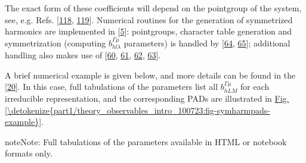\documentclass[letterpaper,table,10pt,english]{jupyterBook}
\begin{document}
\sphinxAtStartPar
The exact form of these coefficients will depend on the point\sphinxhyphen{}group of the system, see, e.g. Refs. {[}\hyperlink{cite.backmatter/bibliography:id553}{118}, \hyperlink{cite.backmatter/bibliography:id836}{119}{]}. Numerical routines for the generation of symmetrized harmonics are implemented in  {[}\hyperlink{cite.backmatter/bibliography:id680}{5}{]}: point\sphinxhyphen{}groups, character table generation and symmetrization (computing \(b_{hl\lambda}^{\Gamma\mu}\) parameters) is handled by  {[}\hyperlink{cite.backmatter/bibliography:id706}{64}, \hyperlink{cite.backmatter/bibliography:id707}{65}{]}; additional handling also makes use of  {[}\hyperlink{cite.backmatter/bibliography:id885}{60}, \hyperlink{cite.backmatter/bibliography:id954}{61}, \hyperlink{cite.backmatter/bibliography:id955}{62}, \hyperlink{cite.backmatter/bibliography:id956}{63}{]}.

\sphinxAtStartPar
A brief numerical example is given below, and more details can be found in the  {[}\hyperlink{cite.backmatter/bibliography:id679}{20}{]}. In this case, full tabulations of the parameters list all \(b_{hLM}^{\Gamma\mu}\) for each irreducible representation, and the corresponding PADs are illustrated in \hyperref[\detokenize{part1/theory_observables_intro_100723:fig-symharmpads-example}]{Fig.\@ \ref{\detokenize{part1/theory_observables_intro_100723:fig-symharmpads-example}}}.

\begin{sphinxShadowBox}
\sphinxstylesidebartitle{}

\begin{sphinxadmonition}{note}{Note:}
\sphinxAtStartPar
Full tabulations of the parameters available in HTML or notebook formats only.
\end{sphinxadmonition}
\end{sphinxShadowBox}
\end{document}
